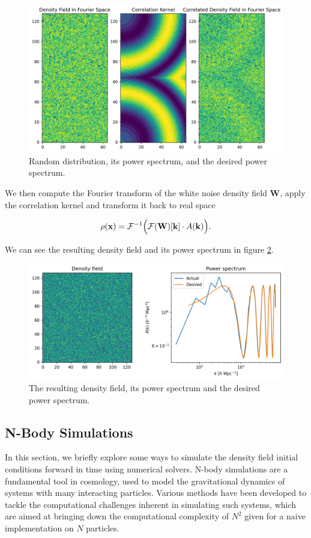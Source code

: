\documentclass{article}
\begin{document}
\begin{figure}[h]
    \centering
    \includegraphics[width=0.7\linewidth]{img/IC_sine_corr.png}
   \caption{Random distribution, its power spectrum, and the desired power spectrum.}
\label{fig:cocrr}
\end{figure}

We then compute the Fourier transform of the white noise density field $\mathbf{W}$, apply the correlation kernel and transform it back to real space

\begin{equation}
     \rho(\mathbf{x}) = \mathcal{F}^{-1} \Bigl( \mathcal{F}(\mathbf{W})[\mathbf{k}] \cdot A(\mathbf{k}) \Bigr).
\end{equation}

We can see the resulting density field and its power spectrum in figure \ref{fig:result}.


\begin{figure}[h]
    \centering
    \includegraphics[width=0.7\linewidth]{img/IC_sine_res.png}
    \caption{The resulting density field, its power spectrum and the desired power spectrum.}
    \label{fig:result}
\end{figure}



\subsection{N-Body Simulations}
\label{nbody}

In this section, we briefly explore some ways to simulate the density field initial conditions forward in time using numerical solvers. N-body simulations are a fundamental tool in cosmology, used to model the gravitational dynamics of systems with many interacting particles. Various methods have been developed to tackle the computational challenges inherent in simulating such systems, which are aimed at bringing down the computational complexity of $N^2$ given for a naive implementation on $N$ particles.
\end{document}
